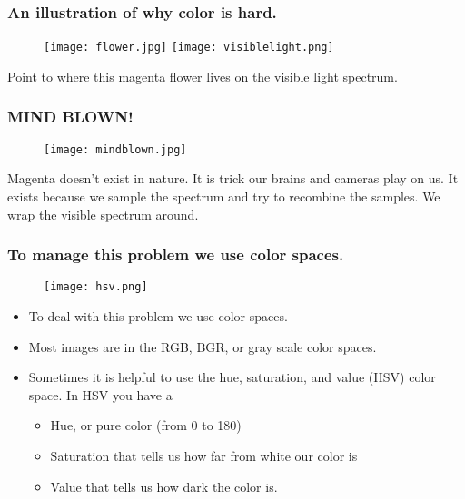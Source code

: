 \documentclass[compress]{beamer}
\begin{document}
\begin{frame}
\frametitle{An illustration of why color is hard.}
 \begin{figure}
     \texttt{[image: flower.jpg]}%
     \quad
     \texttt{[image: visiblelight.png]}%
 \end{figure}
Point to where this magenta flower lives on the visible light spectrum.
\end{frame}
\begin{frame}
\frametitle{MIND BLOWN!}
 \begin{figure}
     \texttt{[image: mindblown.jpg]}
 \end{figure}
Magenta doesn't exist in nature. It is trick our brains and cameras
play on us. It exists because we sample the spectrum and try to
recombine the samples. We wrap the visible spectrum around. 
\end{frame}
\begin{frame}
\frametitle{To manage this problem we use color spaces.}
 \begin{figure}
     \texttt{[image: hsv.png]}
 \end{figure}
\begin{itemize}
\item To deal with this problem we use color spaces. 
\item Most images are in the RGB, BGR, or gray scale color spaces.
\item Sometimes it is helpful to use the hue, saturation, and value (HSV)
color space. In HSV you have a 
\begin{itemize}
\item Hue, or pure color (from 0 to 180) 
\item Saturation that tells us how far from white our color is
\item Value that tells us how dark the color is.
\end{itemize}
\end{itemize}
\end{frame}
\end{document}
